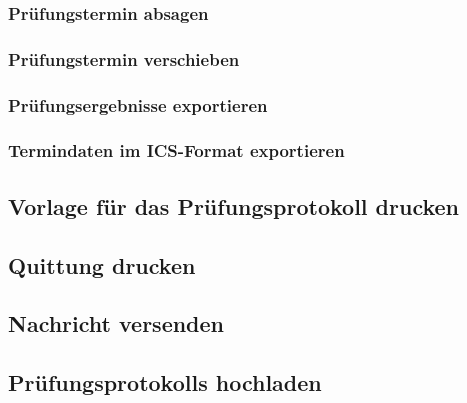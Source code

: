 \subsubsection{Prüfungstermin absagen}
\subsubsection{Prüfungstermin verschieben}

\subsubsection{Prüfungsergebnisse exportieren}

\subsubsection{Termindaten im ICS-Format exportieren}

\subsection{Vorlage für das Prüfungsprotokoll drucken}


\subsection{Quittung drucken}


\subsection{Nachricht versenden}


\subsection{Prüfungsprotokolls hochladen}






